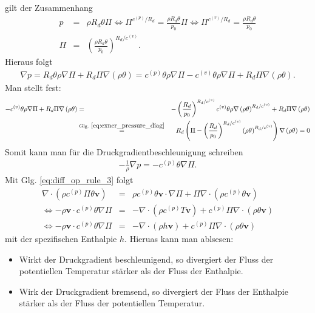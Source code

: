 \documentclass{book}
\begin{document}
%
gilt der Zusammenhang
%
\begin{eqnarray}
p & = & \rho R_d\theta\Pi \Leftrightarrow \Pi^{c^{(p)}/R_d} = \frac{\rho R_d\theta}{p_0}\Pi \Leftrightarrow \Pi^{c^{(v)}/R_d} = \frac{\rho R_d\theta}{p_0}\nonumber\\
\Pi & = & \left(\frac{\rho R_d\theta}{p_0}\right)^{R_d/c^{(v)}}.\label{eq:exner_pressure_diag}
\end{eqnarray}
%
Hieraus folgt
%
\begin{eqnarray}
\nabla p = R_d \theta\rho\nabla\Pi + R_d\Pi\nabla\left(\rho\theta\right) = c^{(p)}\theta\rho\nabla\Pi - c^{(v)}\theta\rho\nabla\Pi + R_d\Pi\nabla\left(\rho\theta\right).
\end{eqnarray}
%
Man stellt fest:
%
\begin{eqnarray}
-c^{(v)}\theta\rho\nabla\Pi + R_d\Pi\nabla\left(\rho\theta\right) & = & -\left(\frac{R_d}{p_0}\right)^{R_d/c^{(v)}}c^{(v)}\theta\rho\nabla\left(\rho\theta\right)^{R_d/c^{(v)}} + R_d\Pi\nabla\left(\rho\theta\right)\nonumber\\
 & \stackrel{\text{Glg. }\eqref{eq:exner_pressure_diag}}{=} & R_d\left(\Pi - \left(\frac{R_d}{p_0}\right)^{R_d/c^{(v)}}\left(\rho\theta\right)^{R_d/c^{(v)}}\right)\nabla\left(\rho\theta\right) = 0
\end{eqnarray}
%
Somit kann man für die Druckgradientbeschleunigung schreiben
%
\begin{eqnarray}
-\frac{1}{\rho}\nabla p = -c^{(p)}\theta\nabla\Pi.\label{eq:exner_pressure_gradient_acc}
\end{eqnarray}
%
Mit Glg. \eqref{eq:diff_op_rule_3} folgt
%
\begin{eqnarray}
\nabla\cdot\left(\rho c^{(p)}\Pi\theta\mathbf{v}\right) & = & \rho c^{(p)}\theta\mathbf{v}\cdot\nabla\Pi + \Pi\nabla\cdot\left(\rho c^{(p)}\theta\mathbf{v}\right)\nonumber\\
\Leftrightarrow -\rho\mathbf{v}\cdot c^{(p)}\theta\nabla\Pi & = & -\nabla\cdot\left(\rho c^{(p)}T\mathbf{v}\right) +  c^{(p)}\Pi\nabla\cdot\left(\rho\theta\mathbf{v}\right)\nonumber\\
\Leftrightarrow -\rho\mathbf{v}\cdot c^{(p)}\theta\nabla\Pi & = & -\nabla\cdot\left(\rho h\mathbf{v}\right) + c^{(p)}\Pi\nabla\cdot\left(\rho\theta\mathbf{v}\right)\
\end{eqnarray}
%
mit der spezifischen Enthalpie $h$. Hieruas kann man ablsesen:
%
\begin{itemize}
\item Wirkt der Druckgradient beschleunigend, so divergiert der Fluss der potentiellen Temperatur stärker als der Fluss der Enthalpie.
\item Wirk der Druckgradient bremsend, so divergiert der Fluss der Enthalpie stärker als der Fluss der potentiellen Temperatur.
\end{itemize}
\end{document}
